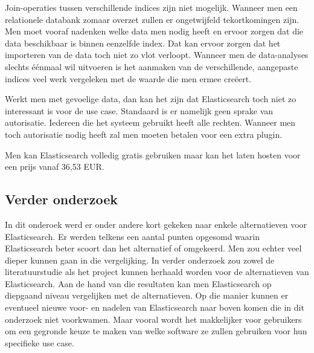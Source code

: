 Join-operaties tussen verschillende indices zijn niet mogelijk. Wanneer men een relationele databank zomaar overzet zullen er ongetwijfeld tekortkomingen zijn. Men moet vooraf nadenken welke data men nodig heeft en ervoor zorgen dat die data beschikbaar is binnen eenzelfde index. Dat kan ervoor zorgen dat het importeren van de data toch niet zo vlot verloopt. Wanneer men de data-analyses slechts éénmaal wil uitvoeren is het aanmaken van de verschillende, aangepaste indices veel werk vergeleken met de waarde die men ermee creëert.

Werkt men met gevoelige data, dan kan het zijn dat Elasticsearch toch niet zo interessant is voor de use case. Standaard is er namelijk geen sprake van autorisatie. Iedereen die het systeem gebruikt heeft alle rechten. Wanneer men toch autorisatie nodig heeft zal men moeten betalen voor een extra plugin.

Men kan Elasticsearch volledig gratis gebruiken maar kan het laten hosten voor een prijs vanaf 36,53 EUR.

\subsection{Verder onderzoek}

In dit onderoek werd er onder andere kort gekeken naar enkele alternatieven voor Elasticsearch. Er werden telkens een aantal punten opgesomd waarin Elasticsearch beter scoort dan het alternatief of omgekeerd. Men zou echter veel dieper kunnen gaan in die vergelijking. In verder onderzoek zou zowel de literatuurstudie als het project kunnen herhaald worden voor de alternatieven van Elasticsearch. Aan de hand van die resultaten kan men Elasticsearch op diepgaand niveau vergelijken met de alternatieven. Op die manier kunnen er eventueel nieuwe voor- en nadelen van Elasticsearch naar boven komen die in dit onderzoek niet voorkwamen. Maar vooral wordt het makkelijker voor gebruikers om een gegronde keuze te maken van welke software ze zullen gebruiken voor hun specifieke use case.